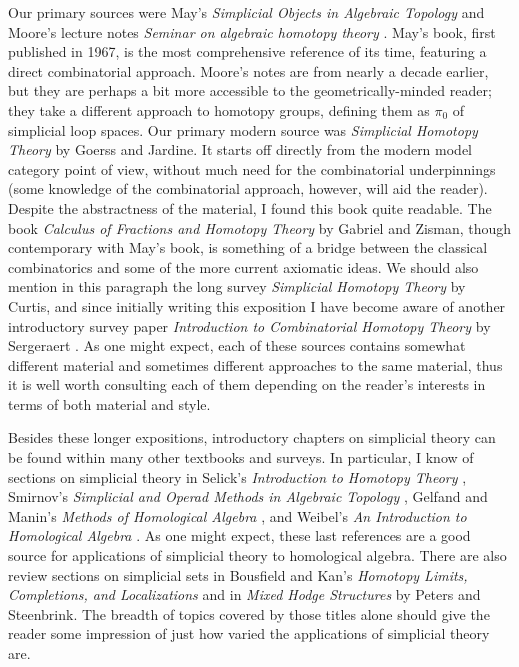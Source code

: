 \documentclass[12pt]{article}
\theoremstyle{plain}
\theoremstyle{definition}
\theoremstyle{remark}
\begin{document}
Our primary sources were May's \emph{Simplicial Objects in Algebraic Topology} \cite{MAY67} and Moore's lecture notes \emph{Seminar on algebraic homotopy theory} \cite{MOORE}. May's book, first published in 1967, is the most comprehensive reference of its time, featuring a direct combinatorial approach. Moore's notes are from nearly a decade earlier, but they are perhaps a bit more accessible to the geometrically-minded reader; they take a different approach to homotopy groups, defining them as $\pi_0$ of simplicial loop spaces. Our primary modern source was \emph{Simplicial Homotopy Theory} \cite{GoeJar} by Goerss and Jardine. It starts off directly from the modern model category point of view, without much need for the combinatorial underpinnings (some knowledge of the combinatorial approach, however, will aid the reader). Despite the abstractness of the material, I found this book quite readable. The book \emph{Calculus of Fractions and Homotopy Theory} \cite{GabZis} by Gabriel and Zisman, though contemporary with May's book, is something of a bridge between the classical combinatorics and some of the more current axiomatic ideas. We should also mention in this paragraph the long survey \emph{Simplicial Homotopy Theory} \cite{Cu71} by Curtis, and since initially writing this exposition I have become aware of another introductory survey paper \emph{Introduction to Combinatorial Homotopy Theory} by Sergeraert \cite{Ser08}. 
As one might expect, each of these sources contains somewhat different material and sometimes different approaches to the same material, thus it is well worth consulting each of them depending on the reader's interests  in terms of both  material and style.

Besides these longer expositions,  introductory chapters on simplicial theory can be found within many other textbooks and surveys. In particular, I know of sections on simplicial theory 
in Selick's \emph{Introduction to Homotopy Theory} \cite{SELICK},
Smirnov's \emph{Simplicial and Operad Methods in Algebraic Topology} \cite{SMIRNOV}, Gelfand and Manin's \emph{Methods of Homological Algebra} \cite{GelMan2}, and Weibel's \emph{An Introduction to Homological Algebra} \cite{WEIB}. As one might expect, these last references are a good source for applications of simplicial theory to homological algebra.  There are also  review sections on simplicial sets in Bousfield and Kan's \emph{Homotopy Limits, Completions, and Localizations} \cite{BouKan} and in \emph{Mixed Hodge Structures} \cite{PetSte} by Peters and Steenbrink.
The breadth of topics covered by those titles alone should give the reader some impression of just how varied the applications of simplicial theory are.
\end{document}
